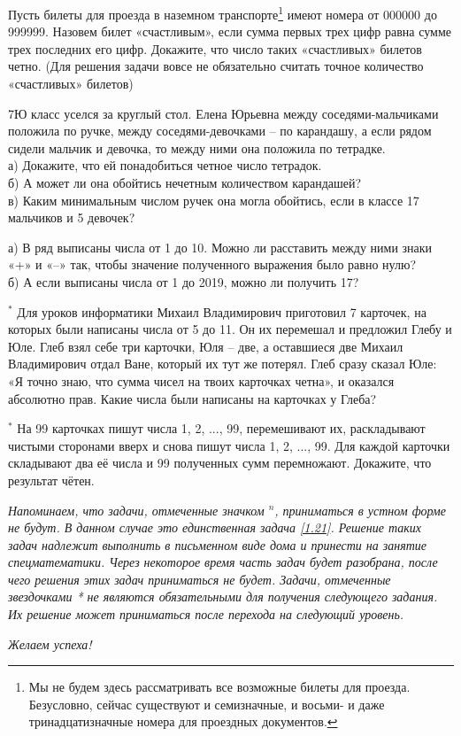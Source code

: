 \begin{thm}
	Пусть билеты для проезда в наземном транспорте\footnote{Мы не будем здесь рассматривать все возможные билеты для проезда. Безусловно, сейчас существуют и семизначные, и восьми- и даже тринадцатизначные номера для проездных документов.}  имеют номера от 000000 до 999999. Назовем билет «счастливым», если сумма первых трех цифр равна сумме трех последних его цифр. Докажите, что число таких «счастливых» билетов четно. (Для решения задачи вовсе не обязательно считать точное количество «счастливых» билетов)
\end{thm}

\begin{thm}
	7Ю класс уселся за круглый стол. Елена Юрьевна между соседями-мальчиками положила по ручке, между соседями-девочками – по карандашу, а если рядом сидели мальчик и девочка, то между ними она положила по тетрадке.\\
	а) Докажите, что ей понадобиться четное число тетрадок.\\
	б) А может ли она обойтись нечетным количеством карандашей?\\
	в) Каким минимальным числом ручек она могла обойтись, если в классе 17 мальчиков и 5 девочек?
\end{thm}

\begin{thm}\label{an1.3}
	а) В ряд выписаны числа от 1 до 10. Можно ли расставить между ними знаки «+» и «–» так, чтобы значение полученного выражения было равно нулю?\\ б) А если выписаны числа от 1 до 2019, можно ли получить 17?
\end{thm}

\begin{thm}$^\ast$
	Для уроков информатики Михаил Владимирович приготовил 7 карточек, на которых были написаны числа от 5 до 11. Он их перемешал и предложил Глебу и Юле. Глеб взял себе три карточки, Юля – две, а оставшиеся две Михаил Владимирович отдал Ване, который их тут же потерял. Глеб сразу сказал Юле: «Я точно знаю, что сумма чисел на твоих карточках четна», и оказался абсолютно прав. Какие числа были написаны на карточках у Глеба?
\end{thm}

\begin{thm}$^\ast$ На 99 карточках пишут числа 1, 2, ..., 99, перемешивают их, раскладывают чистыми сторонами вверх и снова пишут числа 1, 2, ..., 99. Для каждой карточки складывают два её числа и 99 полученных сумм перемножают. Докажите, что результат чётен.
\end{thm}
\textit{ Напоминаем, что задачи, отмеченные значком ${}^{ n}$, приниматься в устном форме не будут. В данном случае это единственная задача \ref{1.21}. Решение таких задач надлежит выполнить в письменном виде дома и принести на занятие спецматематики. Через некоторое время часть задач будет разобрана, после чего решения этих задач приниматься не будет. Задачи, отмеченные звездочками * не являются обязательными для получения следующего задания. Их решение может приниматься после перехода на следующий уровень.}     
\begin{flushright}
	\textit{Желаем успеха!}
\end{flushright}
\newpage